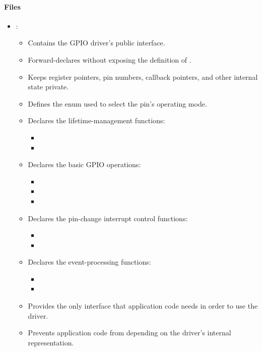 \paragraph{Files}
\begin{itemize}
  \item {}:
  \begin{itemize}
    \item Contains the GPIO driver's public interface.
    \item Forward-declares  without exposing the definition of .
    \item Keeps register pointers, pin numbers, callback pointers, and other internal state
      private.
    \item Defines the  enum used to select the pin's operating mode.
    \item Declares the lifetime-management functions:
    \begin{itemize}
      \item {}
      \item {}
    \end{itemize}
    \item Declares the basic GPIO operations:
    \begin{itemize}
      \item {}
      \item {}
      \item {}
    \end{itemize}
    \item Declares the pin-change interrupt control functions:
    \begin{itemize}
      \item {}
      \item {}
    \end{itemize}
    \item Declares the event-processing functions:
    \begin{itemize}
      \item {}
      \item {}
    \end{itemize}
    \item Provides the only interface that application code needs in order to use the driver.
    \item Prevents application code from depending on the driver's internal representation.

\end{itemize}
\end{itemize}
